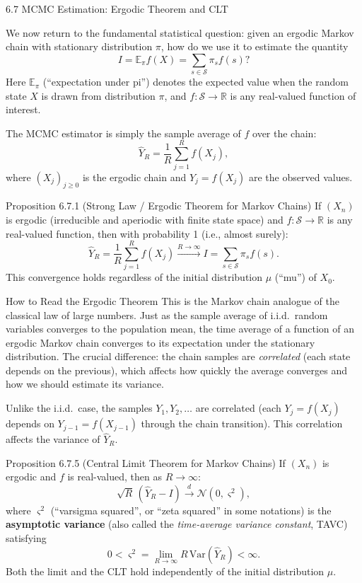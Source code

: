 \documentclass[aspectratio=169,10pt]{beamer}
\newcommand{\EE}{\mathbb{E}}
\newcommand{\RR}{\mathbb{R}}
\begin{document}
\begin{frame}[allowframebreaks]{6.7 MCMC Estimation: Ergodic Theorem and CLT}

We now return to the fundamental statistical question: given an ergodic Markov chain with stationary distribution $\pi$, how do we use it to estimate the quantity
\[
  I = \EE_\pi f(X) = \sum_{s \in \mathcal{S}} \pi_s f(s)?
\]
Here $\EE_\pi$ (``expectation under pi'') denotes the expected value when the random state $X$ is drawn from distribution $\pi$, and $f : \mathcal{S} \to \RR$ is any real-valued function of interest.

The MCMC estimator is simply the sample average of $f$ over the chain:
\[
  \hat{Y}_R = \frac{1}{R} \sum_{j=1}^{R} f(X_j),
\]
where $(X_j)_{j \ge 0}$ is the ergodic chain and $Y_j = f(X_j)$ are the observed values.

\begin{block}{Proposition 6.7.1 (Strong Law / Ergodic Theorem for Markov Chains)}
If $(X_n)$ is ergodic (irreducible and aperiodic with finite state space) and $f : \mathcal{S} \to \RR$ is any real-valued function, then with probability 1 (i.e., almost surely):
\[
  \hat{Y}_R = \frac{1}{R}\sum_{j=1}^{R} f(X_j) \xrightarrow{R \to \infty} I = \sum_{s \in \mathcal{S}} \pi_s f(s).
\]
This convergence holds regardless of the initial distribution $\mu$ (``mu'') of $X_0$.
\end{block}

\begin{alertblock}{How to Read the Ergodic Theorem}
This is the Markov chain analogue of the classical law of large numbers.
Just as the sample average of i.i.d.\ random variables converges to the population mean, the time average of a function of an ergodic Markov chain converges to its expectation under the stationary distribution.
The crucial difference: the chain samples are \emph{correlated} (each state depends on the previous), which affects how quickly the average converges and how we should estimate its variance.
\end{alertblock}

\framebreak

Unlike the i.i.d.\ case, the samples $Y_1, Y_2, \ldots$ are correlated (each $Y_j = f(X_j)$ depends on $Y_{j-1} = f(X_{j-1})$ through the chain transition).
This correlation affects the variance of $\hat{Y}_R$.

\begin{block}{Proposition 6.7.5 (Central Limit Theorem for Markov Chains)}
If $(X_n)$ is ergodic and $f$ is real-valued, then as $R \to \infty$:
\[
  \sqrt{R}\,(\hat{Y}_R - I) \xrightarrow{d} \mathcal{N}(0, \varsigma^2),
\]
where $\varsigma^2$ (``varsigma squared'', or ``zeta squared'' in some notations) is the \textbf{asymptotic variance} (also called the \emph{time-average variance constant}, TAVC) satisfying
\[
  0 < \varsigma^2 = \lim_{R \to \infty} R\,\mathrm{Var}(\hat{Y}_R) < \infty.
\]
Both the limit and the CLT hold independently of the initial distribution $\mu$.
\end{block}


\end{frame}
\end{document}

